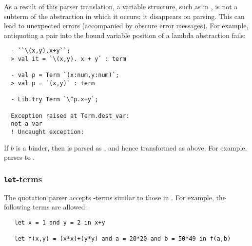 \vspace{1ex}

As a result of this parser translation, a variable structure, such as  in
, is not a subterm of the abstraction
in which it occurs; it disappears on parsing.
This can lead to unexpected errors (accompanied by obscure error
messages).  For example, antiquoting a pair into the bound variable
position of a lambda abstraction fails:

\begin{session}
\begin{verbatim}
  - ``\(x,y).x+y``;
  > val it = `\(x,y). x + y` : term

  - val p = Term `(x:num,y:num)`;
  > val p = `(x,y)` : term

  - Lib.try Term `\^p.x+y`;

  Exception raised at Term.dest_var:
  not a var
  ! Uncaught exception:
\end{verbatim}
\end{session}

If $b$ is a binder, then  is parsed as
, and hence transformed as above.  For
example,
parses to
.


\subsubsection{{\tt let}-terms}
\label{let-exp}

The quotation parser
 accepts -terms
similar to those in \ML. For example, the following terms are allowed:

\begin{hol}
\begin{verbatim}
   let x = 1 and y = 2 in x+y

   let f(x,y) = (x*x)+(y*y) and a = 20*20 and b = 50*49 in f(a,b)
\end{verbatim}
\end{hol}

